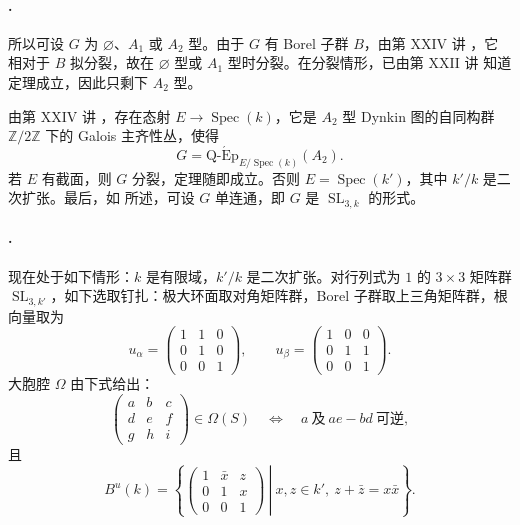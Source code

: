 \paragraph{.}
所以可设 \(G\) 为 \(\varnothing\)、\(A_1\) 或 \(A_2\) 型。由于 \(G\) 有 Borel 子群 \(B\)，由第 XXIV 讲 ，它相对于 \(B\) 拟分裂，故在 \(\varnothing\) 型或 \(A_1\) 型时分裂。在分裂情形，已由第 XXII 讲  知道定理成立，因此只剩下 \(A_2\) 型。

由第 XXIV 讲 ，存在态射 \(E\to\operatorname{Spec}(k)\)，它是 \(A_2\) 型 Dynkin 图的自同构群 \(\mathbb Z/2\mathbb Z\) 下的 Galois 主齐性丛，使得
\[
 G=\operatorname{Q\text{-}\acute{E}p}_{E/\operatorname{Spec}(k)}
 (A_2).
\]
若 \(E\) 有截面，则 \(G\) 分裂，定理随即成立。否则 \(E=\operatorname{Spec}(k')\)，其中 \(k'/k\) 是二次扩张。最后，如  所述，可设 \(G\) 单连通，即 \(G\) 是 \(\operatorname{SL}_{3,k}\) 的形式。

\paragraph{.}
现在处于如下情形：\(k\) 是有限域，\(k'/k\) 是二次扩张。对行列式为 \(1\) 的 \(3\times3\) 矩阵群 \(\operatorname{SL}_{3,k'}\)，如下选取钉扎：极大环面取对角矩阵群，Borel 子群取上三角矩阵群，根向量取为
\[
 u_\alpha=
 \begin{pmatrix}1&1&0\\0&1&0\\0&0&1\end{pmatrix},
 \qquad
 u_\beta=
 \begin{pmatrix}1&0&0\\0&1&1\\0&0&1\end{pmatrix}.
\]
大胞腔 \(\Omega\) 由下式给出：
\[
 \begin{pmatrix}a&b&c\\d&e&f\\g&h&i\end{pmatrix}
 \in\Omega(S)
 \quad\Longleftrightarrow\quad
 a\ \text{及}\ ae-bd\ \text{可逆},
\]
且
\[
 B^u(k)=
 \left\{
 \left.
 \begin{pmatrix}1&\bar x&z\\0&1&x\\0&0&1\end{pmatrix}
 \ \right|\
 x,z\in k',\ z+\bar z=x\bar x
 \right\}.
\]

